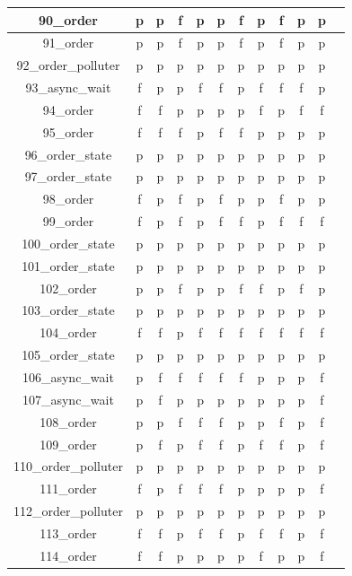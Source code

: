\documentclass[
fancyheadings, %
%
%
]{stsreprt}
\begin{document}
\begin{longtable}{|c|c|c|c|c|c|c|c|c|c|c|c|}
\hline
90\_order & p & p & f & p & p & f & p & f & p & p \\
\hline
91\_order & p & p & f & p & p & f & p & f & p & p \\
\hline
92\_order\_polluter & p & p & p & p & p & p & p & p & p & p \\
\hline
93\_async\_wait & f & p & p & f & f & p & f & f & f & p \\
\hline
94\_order & f & f & p & p & p & p & f & p & f & f \\
\hline
95\_order & f & f & f & p & f & f & p & p & p & p \\
\hline
96\_order\_state & p & p & p & p & p & p & p & p & p & p \\
\hline
97\_order\_state & p & p & p & p & p & p & p & p & p & p \\
\hline
98\_order & f & p & f & p & f & p & p & f & p & p \\
\hline
99\_order & f & p & f & p & f & f & p & f & f & f \\
\hline
100\_order\_state & p & p & p & p & p & p & p & p & p & p \\
\hline
101\_order\_state & p & p & p & p & p & p & p & p & p & p \\
\hline
102\_order & p & p & f & p & p & f & f & p & f & p \\
\hline
103\_order\_state & p & p & p & p & p & p & p & p & p & p \\
\hline
104\_order & f & f & p & f & f & f & f & f & f & f \\
\hline
105\_order\_state & p & p & p & p & p & p & p & p & p & p \\
\hline
106\_async\_wait & p & f & f & f & f & f & p & p & p & f \\
\hline
107\_async\_wait & p & f & p & p & p & p & p & p & p & f \\
\hline
108\_order & p & p & f & f & f & p & p & f & p & f \\
\hline
109\_order & p & f & p & f & f & p & f & f & p & f \\
\hline
110\_order\_polluter & p & p & p & p & p & p & p & p & p & p \\
\hline
111\_order & f & p & f & f & f & p & p & p & p & f \\
\hline
112\_order\_polluter & p & p & p & p & p & p & p & p & p & p \\
\hline
113\_order & f & f & p & f & f & p & f & f & p & f \\
\hline
114\_order & f & f & p & p & p & p & f & p & p & f \\

\end{longtable}
\end{document}
